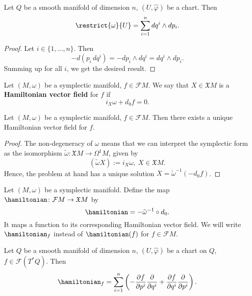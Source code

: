 \begin{corollary}
  Let
    $Q$ be a smooth manifold of dimension $n$,
    $(U, \hat{\varphi})$ be a chart.
  Then
  \begin{equation}
    \restrict{\omega}{U} = \sum_{i = 1}^n d q^i \wedge d p_i.
  \end{equation}
\end{corollary}
\begin{proof}
  Let $i \in \{1, ..., n\}$.
  Then
  \begin{equation}
    - d(p_i\, d q^i) = - d p_i \wedge d q^i = d q^i \wedge d p_i.
  \end{equation}
  Summing up for all $i$, we get the desired result.
\end{proof}
\begin{definition}
  Let $(M, \omega)$ be a symplectic manifold, $f \in \mathcal{F} M$.
  We say that $X \in \mathfrak{X} M$ is a \textbf{Hamiltonian vector field} for
  $f$ if
  \begin{equation}
    i_X \omega + d_0 f = 0.
  \end{equation}
\end{definition}
\begin{proposition}
  Let $(M, \omega)$ be a symplectic manifold, $f \in \mathcal{F} M$.
  Then there exists a unique Hamiltonian vector field for $f$.
\end{proposition}
\begin{proof}
  The non-degeneracy of $\omega$ means that we can interpret the symplectic form
  as the isomorphism $\tilde{\omega} \colon \mathfrak{X} M \to \Omega^1 M$,
  given by
  \begin{equation}
    (\tilde{\omega} X) := i_X \omega,\ X \in \mathfrak{X} M.
  \end{equation}
  Hence, the problem at hand has a unique solution
  $X = \tilde{\omega}^{-1}(- d_0 f)$.
\end{proof}
\begin{definition}
  Let $(M, \omega)$ be a symplectic manifold.
  Define the map $\hamiltonian \colon \mathcal{F} M \to \mathfrak{X} M$ by
  \begin{equation}
    \hamiltonian = - \tilde{\omega}^{-1} \circ d_0.
  \end{equation}
  It maps a function to its corresponding Hamiltonian vector field.
  We will write $\hamiltonian_f$ instead of $\hamiltonian(f)$
  for $f \in \mathcal{F} M$.
\end{definition}
\begin{proposition}
  Let
    $Q$ be a smooth manifold of dimension $n$,
    $(U, \hat{\varphi})$ be a chart on $Q$,
    $f \in \mathcal{F}(T^* Q)$.
  Then
  \begin{equation}
    \hamiltonian_f
    = \sum_{i = 1}^n
    \left(
      - \frac{\partial f}{\partial p^i} \frac{\partial}{\partial q^i}
      + \frac{\partial f}{\partial q^i} \frac{\partial}{\partial p^i}
    \right).
  \end{equation}
\end{proposition}

